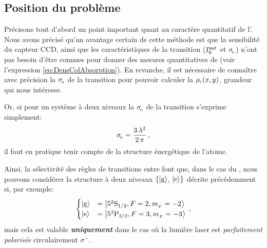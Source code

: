 \subsection{Position du problème}
Précisons tout d'abord un point important quant au caractère quantitatif de l'\ipafas. Nous avons précisé qu'un avantage certain de cette méthode est que la sensibilité du capteur CCD, ainsi que les caractéristiques de la transition (${I^{\rm sat}_{0}}$ et ${\sigma_{_{\hspace{-1pt}{0}}}}$) n'ont pas besoin d'être connues pour donner des mesures quantitatives de \do (voir l'expression \vref{eq:DensColAbsorption}). En revanche, il est nécessaire de connaître avec précision la \seff ${\sigma_{_{\hspace{-1pt}{0}}}}$ de la transition pour pouvoir calculer la \dcol ${{\rho_{\rm{c}}}}(x,y)$, grandeur qui nous intéresse.

\noindent Or, si pour un système à deux niveaux la \seff ${\sigma_{_{\hspace{-1pt}{0}}}}$ de la transition s'exprime simplement:
\begin{equation}
	\seceff = \frac{3\,\lambda^2}{2\,\pi}
\virguleformule
	\label{eq:seff}
\end{equation} 
il faut en pratique tenir compte de la structure énergétique de l'atome.

\casse

%
\noindent  
Ainsi, la sélectivité des règles de transitions entre \snx font que, dans le cas du \Rb, nous pouvons considérer la structure à deux niveaux $\{{{\left| {\rm g} \right\rangle}}$, ${{\left| {\rm e} \right\rangle}}\}$ décrite précédemment si, par exemple:
\begin{equation}
\begin{cases}
	\EtatG & = \EtatSFmF{2}{-2} \\
	\EtatE & = \EtatPFmF{3}{-3} 
\end{cases}
	\virguleformule
	\label{eq:Rb2niv}
\end{equation}
mais cela est valable \textbf{\emph{uniquement}} dans le cas où la lumière laser est \emph{parfaitement polarisée} circulairement $\sigma^{-}$. 


